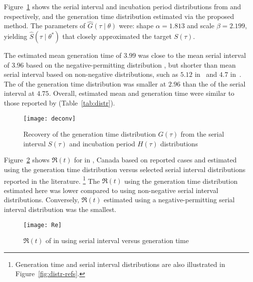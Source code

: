 Figure~\ref{fig:deconv} shows the
serial interval and incubation period distributions
from \cite{Du2020} and \cite{Lauer2020} respectively,
and the generation time distribution estimated via the proposed method.
The \mle parameters of $\hat{G}(\tau\mid\theta)$ were:
shape ${\alpha = 1.813}$ and scale ${\beta = 2.199}$,
yielding $\hat{S}(\tau\mid\theta^*)$ that closely approximated
the target $S(\tau)$.
\par
The estimated mean generation time of $3.99$ was close to
the mean serial interval of $3.96$
based on the negative-permitting distribution \cite{Du2020},
but shorter than mean serial interval based on non-negative distributions,
such as $5.12$ in~\cite{Zhang2020} and $4.7$ in~\cite{Nishiura2020}.
The \sd of the generation time distribution was smaller at $2.96$
than the \sd of the serial interval at $4.75$.
Overall, estimated mean and \sd generation time
were similar to those reported by \textcite{Ganyani2020}
(Table~\ref{tab:distr}).
\par
\begin{figure}
  \centering
  \texttt{[image: deconv]}
  \caption{Recovery of the generation time distribution $G(\tau)$
    from the serial interval $S(\tau)$
    and incubation period $H(\tau)$ distributions}
  \label{fig:deconv}
\end{figure}
\par
Figure~\ref{fig:Re(t)} shows
$\Re(t)$ for \covid in \gta, Canada
based on reported cases and estimated using
the generation time distribution versus
selected serial interval distributions reported in the literature.%
\footnote{Generation time and serial interval distributions
  are also illustrated in Figure~\ref{fig:distr-refs}.}
The $\Re(t)$ using the generation time distribution estimated here
was lower compared to using non-negative serial interval distributions.
Conversely, $\Re(t)$ estimated using
a negative-permitting serial interval distribution was the smallest.
\par
\begin{figure}[h]
  \centering
  \texttt{[image: Re]}
  \caption{$\Re(t)$ of \covid in \gta using
    serial interval versus generation time}
  \label{fig:Re(t)}
\end{figure}